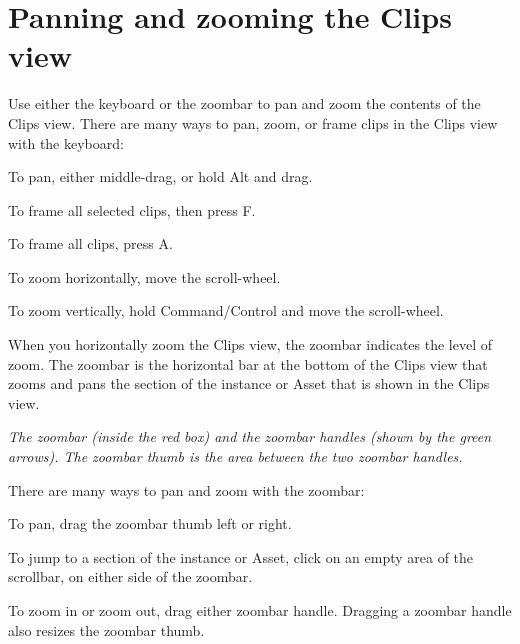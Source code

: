 \chapter{Panning and zooming the Clips view}
\hypertarget{md__hey_tea_9_2_library_2_package_cache_2com_8unity_8timeline_0d1_87_85_2_documentation_0i_2clp__pan__zoom}{}\label{md__hey_tea_9_2_library_2_package_cache_2com_8unity_8timeline_0d1_87_85_2_documentation_0i_2clp__pan__zoom}
\label{md__hey_tea_9_2_library_2_package_cache_2com_8unity_8timeline_0d1_87_85_2_documentation_0i_2clp__pan__zoom_autotoc_md4619}%
%
 Use either the keyboard or the zoombar to pan and zoom the contents of the Clips view. There are many ways to pan, zoom, or frame clips in the Clips view with the keyboard\+:


\begin{DoxyItemize}
\item To pan, either middle-\/drag, or hold Alt and drag.
\item To frame all selected clips,  then press F.
\item To frame all clips, press A.
\item To zoom horizontally, move the scroll-\/wheel.
\item To zoom vertically, hold Command/\+Control and move the scroll-\/wheel.
\end{DoxyItemize}

When you horizontally zoom the Clips view, the zoombar indicates the level of zoom. The zoombar is the horizontal bar at the bottom of the Clips view that zooms and pans the section of the  instance or  Asset that is shown in the Clips view.



{\itshape The zoombar (inside the red box) and the zoombar handles (shown by the green arrows). The zoombar thumb is the area between the two zoombar handles.}

There are many ways to pan and zoom with the zoombar\+:


\begin{DoxyItemize}
\item To pan, drag the zoombar thumb left or right.
\item To jump to a section of the  instance or  Asset, click on an empty area of the scrollbar, on either side of the zoombar.
\item To zoom in or zoom out, drag either zoombar handle. Dragging a zoombar handle also resizes the zoombar thumb.
\end{DoxyItemize}

